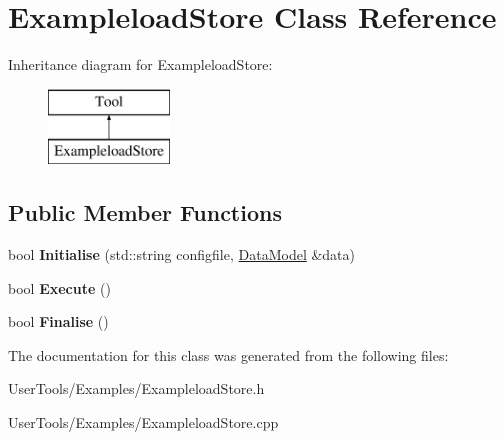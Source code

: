 \hypertarget{classExampleloadStore}{\section{Exampleload\-Store Class Reference}
\label{classExampleloadStore}
}
Inheritance diagram for Exampleload\-Store\-:\begin{figure}[H]
\begin{center}
\leavevmode
\includegraphics[height=2.000000cm]{classExampleloadStore}
\end{center}
\end{figure}
\subsection*{Public Member Functions}
\begin{DoxyCompactItemize}
\item 
\hypertarget{classExampleloadStore_aa36ea82e625367750cf90f47b68b4868}{bool {\bfseries Initialise} (std\-::string configfile, \hyperlink{classDataModel}{Data\-Model} \&data)}\label{classExampleloadStore_aa36ea82e625367750cf90f47b68b4868}

\item 
\hypertarget{classExampleloadStore_abb8ad989ae4890d9058989e9f4c1c5a7}{bool {\bfseries Execute} ()}\label{classExampleloadStore_abb8ad989ae4890d9058989e9f4c1c5a7}

\item 
\hypertarget{classExampleloadStore_a0170aae0ee1e46ea8e6132fb4874bb8d}{bool {\bfseries Finalise} ()}\label{classExampleloadStore_a0170aae0ee1e46ea8e6132fb4874bb8d}

\end{DoxyCompactItemize}


The documentation for this class was generated from the following files\-:\begin{DoxyCompactItemize}
\item 
User\-Tools/\-Examples/Exampleload\-Store.\-h\item 
User\-Tools/\-Examples/Exampleload\-Store.\-cpp\end{DoxyCompactItemize}
